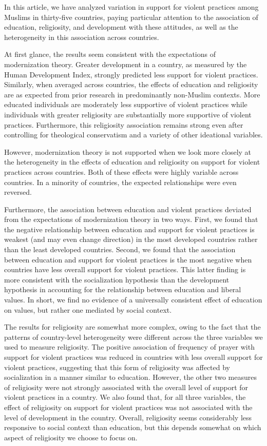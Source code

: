 \documentclass[10pt,letterpaper]{article}
\begin{document}
In this article, we have analyzed variation in support for violent practices among Muslims in thirty-five countries, paying particular attention to the association of education, religiosity, and development with these attitudes, as well as the heterogeneity in this association across countries.

At first glance, the results seem consistent with the expectations of modernization theory. Greater development in a country, as measured by the Human Development Index, strongly predicted less support for violent practices. Similarly, when averaged across countries, the effects of education and religiosity are as expected from prior research in predominantly non-Muslim contexts. More educated individuals are moderately less supportive of violent practices while individuals with greater religiosity are substantially more supportive of violent practices. Furthermore, this religiosity association remains strong even after controlling for theological conservatism and a variety of other ideational variables.

However, modernization theory is not supported when we look more closely at the heterogeneity in the effects of education and religiosity on support for violent practices across countries. Both of these effects were highly variable across countries. In a minority of countries, the expected relationships were even reversed.

Furthermore, the association between education and violent practices deviated from the expectations of modernization theory in two ways. First, we found that the negative relationship between education and support for violent practices is weakest (and may even change direction) in the most developed countries rather than the least developed countries. Second, we found that the association between education and support for violent practices is the most negative when countries have less overall support for violent practices. This latter finding is more consistent with the socialization hypothesis than the development hypothesis in accounting for the relationship between education and liberal values. In short, we find no evidence of a universally consistent effect of education on values, but rather one mediated by social context.

The results for religiosity are somewhat more complex, owing to the fact that the patterns of country-level heterogeneity were different across the three variables we used to measure religiosity. The positive association of frequency of prayer with support for violent practices was reduced in countries with less overall support for violent practices, suggesting that this form of religiosity was affected by socialization in a manner similar to education. However, the other two measures of religiosity were not strongly associated with the overall level of support for violent practices in a country. We also found that, for all three variables, the effect of religiosity on support for violent practices was not associated with the level of development in the country. Overall, religiosity seems considerably less responsive to social context than education, but this depends somewhat on which aspect of religiosity we choose to focus on.
\end{document}
